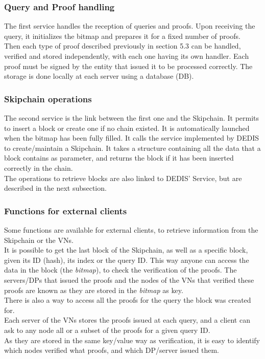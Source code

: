 \documentclass{article}
\begin{document}
\subsubsection{Query and Proof handling}
The first service handles the reception of queries and proofs.
Upon receiving the query, it initializes the bitmap and prepares it for a fixed number of proofs.\\
Then each type of proof described previously in section 5.3 can be handled, verified and stored independently, with each one having its own handler. Each proof must be signed by the entity that issued it to be processed correctly. The storage is done locally at each server using a database (DB).

\subsubsection{Skipchain operations}
The second service is the link between the first one and the Skipchain. It permits to insert a block or create one if no chain existed. It is automatically launched when the bitmap has been fully filled. It calls the service implemented by DEDIS to create/maintain a Skipchain. It takes a structure containing all the data that a block contains as parameter, and returns the block if it has been inserted correctly in the chain.\\
The operations to retrieve blocks are also linked to DEDIS' Service, but are described in the next subsection.

\subsubsection{Functions for external clients}
Some functions are available for external clients, to retrieve information from the Skipchain or the VNs.\\
It is possible to get the last block of the Skipchain, as well as a specific block, given its ID (hash), its index or the query ID. This way anyone can access the data in the block (the \textit{bitmap}), to check the verification of the proofs. The servers/DPs that issued the proofs and the nodes of the VNs that verified these proofs are known as they are stored in the \textit{bitmap} as key.\\

There is also a way to access all the proofs for the query the block was created for.\\
Each server of the VNs stores the proofs issued at each query, and a client can ask to any node all or a subset of the proofs for a given query ID.\\
As they are stored in the same key/value way as verification, it is easy to identify which nodes verified what proofs, and which DP/server issued them.
\end{document}
